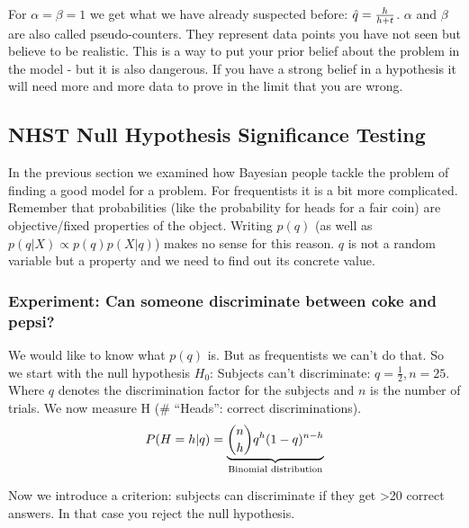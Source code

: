 
For $\alpha = \beta = 1$ we get what we have already suspected before: $\est{q}=\frac{h}{h+t}$. $\alpha$ and $\beta$ are also called pseudo-counters. They represent data points you have not seen but believe to be realistic. This is a way to put your prior belief about the problem in the model - but it is also dangerous. If you have a strong belief in a hypothesis it will need more and more data to prove in the limit that you are wrong.



\subsection[Null Hypothesis Significance Testing (NHST)]{NHST Null Hypothesis Significance Testing}
In the previous section we examined how Bayesian people tackle the problem of finding a good model for a problem. For frequentists it is a bit more complicated. Remember that probabilities (like the probability for heads for a fair coin) are objective/fixed properties of the object. Writing $p(q)$ (as well as $p(q|X) \propto p(q)p(X|q)$) makes no sense for this reason. $q$ is not a random variable but a property and we need to find out its concrete value.

\subsubsection*{Experiment: Can someone discriminate between coke and pepsi?}
We would like to know what $p(q)$ is. But as frequentists we can't do that. So we start with the null hypothesis $H_0$: Subjects can't discriminate: $q = \frac{1}{2}, n = 25$. Where $q$ denotes the discrimination factor for the subjects and $n$ is the number of trials. We now measure H (\# ``Heads'': correct discriminations).
\begin{align*}
P(H=h|q) = \underbrace{ \binom{n}{h} q^h (1-q)^{n-h} }_\text{Binomial distribution}\index{Binomial Distribution}
\end{align*}

Now we introduce a criterion: subjects can discriminate if they get >20 correct answers. In that case you reject the null hypothesis.

